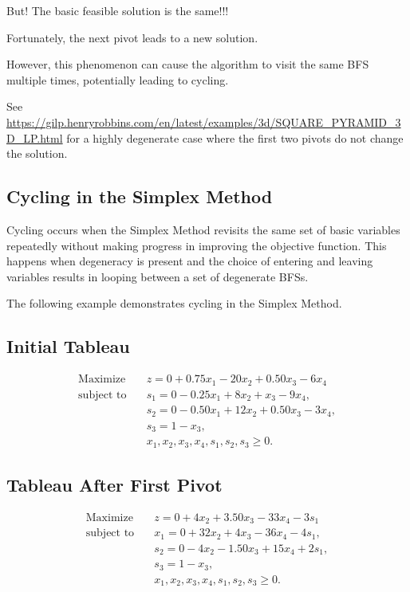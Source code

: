 But!  The basic feasible solution is the same!!!

Fortunately, the next pivot leads to a new solution.

However, this phenomenon can cause the algorithm to visit the same BFS multiple times, potentially leading to cycling.

See \url{https://gilp.henryrobbins.com/en/latest/examples/3d/SQUARE_PYRAMID_3D_LP.html} for a highly degenerate case where the first two pivots do not change the solution.

\subsection{Cycling in the Simplex Method}
Cycling occurs when the Simplex Method revisits the same set of basic variables repeatedly without making progress in improving the objective function. This happens when degeneracy is present and the choice of entering and leaving variables results in looping between a set of degenerate BFSs.

The following example demonstrates cycling in the Simplex Method.

\subsection*{Initial Tableau}
\[
\begin{aligned}
\text{Maximize} \quad & z = 0 + 0.75x_1 - 20x_2 + 0.50x_3 - 6x_4 \\
\text{subject to} \quad 
& s_1 = 0 - 0.25x_1 + 8x_2 + x_3 - 9x_4, \\
& s_2 = 0 - 0.50x_1 + 12x_2 + 0.50x_3 - 3x_4, \\
& s_3 = 1 - x_3, \\
& x_1, x_2, x_3, x_4, s_1, s_2, s_3 \geq 0.
\end{aligned}
\]

\subsection*{Tableau After First Pivot}
\[
\begin{aligned}
\text{Maximize} \quad & z = 0 + 4x_2 + 3.50x_3 - 33x_4 - 3s_1 \\
\text{subject to} \quad 
& x_1 = 0 + 32x_2 + 4x_3 - 36x_4 - 4s_1, \\
& s_2 = 0 - 4x_2 - 1.50x_3 + 15x_4 + 2s_1, \\
& s_3 = 1 - x_3, \\
& x_1, x_2, x_3, x_4, s_1, s_2, s_3 \geq 0.
\end{aligned}
\]

